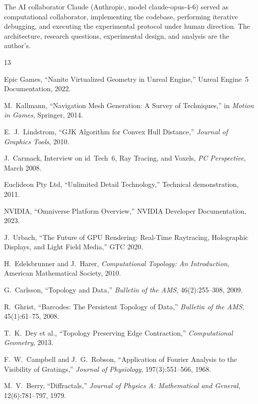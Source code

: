 \documentclass[11pt,a4paper]{article}
\theoremstyle{remark}
\begin{document}
The AI collaborator Claude (Anthropic, model claude-opus-4-6) served as computational collaborator, implementing the codebase, performing iterative debugging, and executing the experimental protocol under human direction. The architecture, research questions, experimental design, and analysis are the author's.

\begin{thebibliography}{13}

Epic Games, ``Nanite Virtualized Geometry in Unreal Engine,'' Unreal Engine~5 Documentation, 2022.

M.~Kallmann, ``Navigation Mesh Generation: A Survey of Techniques,'' in \emph{Motion in Games}, Springer, 2014.

E.~J.~Lindstrom, ``GJK Algorithm for Convex Hull Distance,'' \emph{Journal of Graphics Tools}, 2010.

J.~Carmack, Interview on id~Tech~6, Ray Tracing, and Voxels, \emph{PC Perspective}, March 2008.

Euclideon Pty Ltd, ``Unlimited Detail Technology,'' Technical demonstration, 2011.

NVIDIA, ``Omniverse Platform Overview,'' NVIDIA Developer Documentation, 2023.

J.~Urbach, ``The Future of GPU Rendering: Real-Time Raytracing, Holographic Displays, and Light Field Media,'' GTC 2020.

H.~Edelsbrunner and J.~Harer, \emph{Computational Topology: An Introduction}, American Mathematical Society, 2010.

G.~Carlsson, ``Topology and Data,'' \emph{Bulletin of the AMS}, 46(2):255--308, 2009.

R.~Ghrist, ``Barcodes: The Persistent Topology of Data,'' \emph{Bulletin of the AMS}, 45(1):61--75, 2008.

T.~K.~Dey et al., ``Topology Preserving Edge Contraction,'' \emph{Computational Geometry}, 2013.

F.~W.~Campbell and J.~G.~Robson, ``Application of Fourier Analysis to the Visibility of Gratings,'' \emph{Journal of Physiology}, 197(3):551--566, 1968.

M.~V.~Berry, ``Diffractals,'' \emph{Journal of Physics A: Mathematical and General}, 12(6):781--797, 1979.

\end{thebibliography}
\end{document}
